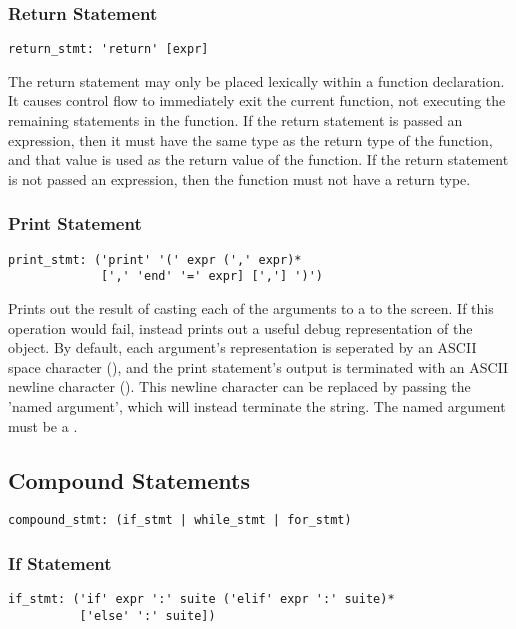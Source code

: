 \subsubsection{Return Statement}

\begin{lstlisting}
return_stmt: 'return' [expr]
\end{lstlisting}

The return statement may only be placed lexically within a function declaration.
It causes control flow to immediately exit the current function, not executing
the remaining statements in the function. If the return statement is passed an
expression, then it must have the same type as the return type of the function,
and that value is used as the return value of the function. If the return
statement is not passed an expression, then the function must not have a return
type.

\subsubsection{Print Statement}

\begin{lstlisting}
print_stmt: ('print' '(' expr (',' expr)*
             [',' 'end' '=' expr] [','] ')')
\end{lstlisting}

Prints out the result of casting each of the arguments to a  to the
screen. If this operation would fail, instead prints out a useful debug
representation of the object. By default, each argument's representation is
seperated by an ASCII space character (), and the print statement's
output is terminated with an ASCII newline character (). This
newline character can be replaced by passing the  'named argument',
which will instead terminate the string. The  named argument must be a
.

\subsection{Compound Statements}

\begin{lstlisting}
compound_stmt: (if_stmt | while_stmt | for_stmt)
\end{lstlisting}

\subsubsection{If Statement}
\begin{lstlisting}
if_stmt: ('if' expr ':' suite ('elif' expr ':' suite)*
          ['else' ':' suite])
\end{lstlisting}

